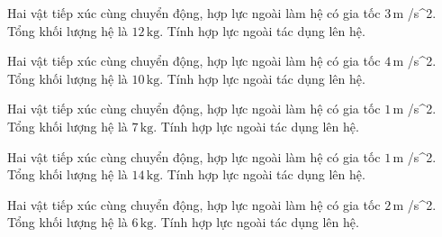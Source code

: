 \begin{ex}
Hai vật tiếp xúc cùng chuyển động, hợp lực ngoài làm hệ có gia tốc $3\,\text{m}$ /s^2. Tổng khối lượng hệ là $12\,\text{kg}$. Tính hợp lực ngoài tác dụng lên hệ.
\end{ex}

\begin{ex}
Hai vật tiếp xúc cùng chuyển động, hợp lực ngoài làm hệ có gia tốc $4\,\text{m}$ /s^2. Tổng khối lượng hệ là $10\,\text{kg}$. Tính hợp lực ngoài tác dụng lên hệ.
\end{ex}

\begin{ex}
Hai vật tiếp xúc cùng chuyển động, hợp lực ngoài làm hệ có gia tốc $1\,\text{m}$ /s^2. Tổng khối lượng hệ là $7\,\text{kg}$. Tính hợp lực ngoài tác dụng lên hệ.
\end{ex}

\begin{bt}
Hai vật tiếp xúc cùng chuyển động, hợp lực ngoài làm hệ có gia tốc $1\,\text{m}$ /s^2. Tổng khối lượng hệ là $14\,\text{kg}$. Tính hợp lực ngoài tác dụng lên hệ.
\end{bt}

\begin{bt}
Hai vật tiếp xúc cùng chuyển động, hợp lực ngoài làm hệ có gia tốc $2\,\text{m}$ /s^2. Tổng khối lượng hệ là $6\,\text{kg}$. Tính hợp lực ngoài tác dụng lên hệ.
\end{bt}

